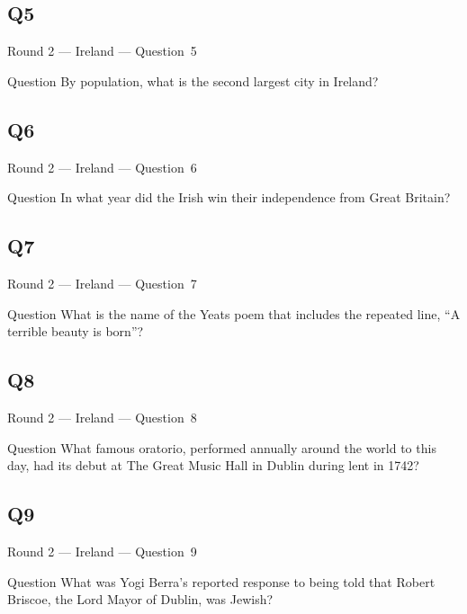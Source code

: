 \documentclass[11pt]{beamer}
\begin{document}
\subsection*{Q5}
\begin{frame}[t]{Round 2 --- Ireland --- \mbox{Question 5}}
    \vspace{-0.5em}
    \begin{block}{Question}
        By population, what is the second largest city in Ireland?
    \end{block}
\end{frame}
\subsection*{Q6}
\begin{frame}[t]{Round 2 --- Ireland --- \mbox{Question 6}}
    \vspace{-0.5em}
    \begin{block}{Question}
        In what year did the Irish win their independence from Great Britain?
    \end{block}
\end{frame}
\subsection*{Q7}
\begin{frame}[t]{Round 2 --- Ireland --- \mbox{Question 7}}
    \vspace{-0.5em}
    \begin{block}{Question}
        What  is the name of the Yeats poem that includes the repeated line, ``A terrible beauty is born''?
    \end{block}
\end{frame}
\subsection*{Q8}
\begin{frame}[t]{Round 2 --- Ireland --- \mbox{Question 8}}
    \vspace{-0.5em}
    \begin{block}{Question}
        What famous oratorio, performed annually around the world to this day, had its debut at The Great Music Hall in Dublin during lent in 1742?
    \end{block}
\end{frame}
\subsection*{Q9}
\begin{frame}[t]{Round 2 --- Ireland --- \mbox{Question 9}}
    \vspace{-0.5em}
    \begin{block}{Question}
        What was Yogi Berra's reported response to being told that Robert Briscoe, the Lord Mayor of Dublin, was Jewish?
    \end{block}
\end{frame}
\end{document}
